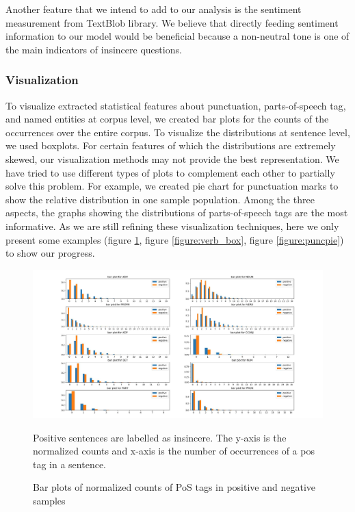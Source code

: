 \documentclass[12pt]{diazessay} %
\begin{document}
Another feature that we intend to add to our analysis is the sentiment measurement from TextBlob library. We believe that directly feeding sentiment information to our model would be beneficial because a non-neutral tone is one of the main indicators of insincere questions. 

\subsubsection{Visualization}

To visualize extracted statistical features about punctuation, parts-of-speech tag, and named entities at corpus level, we created bar plots for the counts of the occurrences over the entire corpus. To visualize the distributions at sentence level, we used boxplots. For certain features of which the distributions are extremely skewed, our visualization methods may not provide the best representation. We have tried to use different types of plots to complement each other to partially solve this problem. For example, we created pie chart for punctuation marks to show the relative distribution in one sample population. Among the three aspects, the graphs showing the distributions of parts-of-speech tags are the most informative. As we are still refining these visualization techniques, here we only present some examples (figure \ref{figure:pos_bar}, figure \ref{figure:verb_box}, figure \ref{figure:puncpie}) to show our progress. 

\begin{figure}
	\centering
	\includegraphics[width=\textwidth]{graphs/pos_bar.jpeg}
	\caption{Bar plots of normalized counts of PoS tags in positive and negative samples}
	\medskip
	\small
	Positive sentences are labelled as insincere. The y-axis is the normalized counts and x-axis is the number of occurrences of a pos tag in a sentence. 
	\label{figure:pos_bar}
\end{figure}
\end{document}
